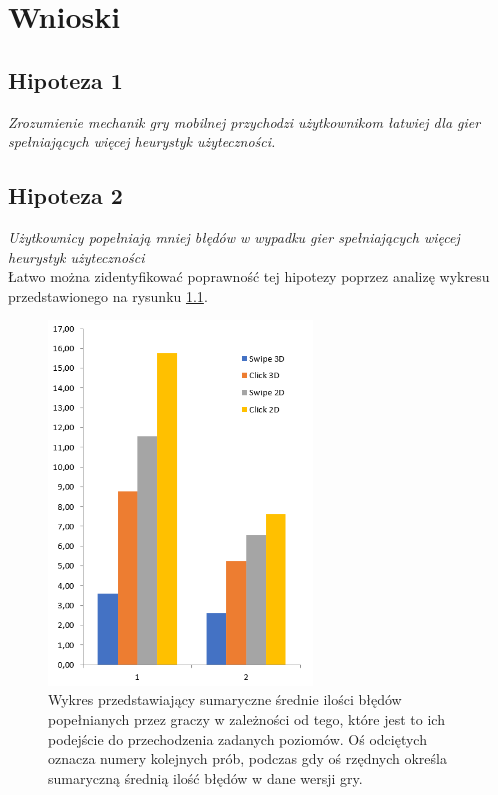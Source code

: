 \documentclass[a4paper,12pt,numbers=noenddot]{report}
\begin{document}
\chapter{Wnioski}

\section{Hipoteza 1}
\textit{Zrozumienie mechanik gry mobilnej przychodzi użytkownikom łatwiej dla gier spełniających więcej heurystyk użyteczności.}\\

\section{Hipoteza 2}

\textit{Użytkownicy popełniają mniej błędów w wypadku gier spełniających więcej heurystyk użyteczności}\\


Łatwo można zidentyfikować poprawność tej hipotezy poprzez analizę wykresu przedstawionego na rysunku \ref{fig:diag_errors_sum}. 

\begin{figure}[h!]
	\centering
  	\includegraphics[width=7cm]{diag/errors_sum.png}
	\caption{Wykres przedstawiający sumaryczne średnie ilości błędów popełnianych przez graczy w zależności od tego, które jest to ich podejście do przechodzenia zadanych poziomów. Oś odciętych oznacza numery kolejnych prób, podczas gdy oś rzędnych określa sumaryczną średnią ilość błędów w dane wersji gry.}
	\label{fig:diag_errors_sum}
\end{figure}
\end{document}
